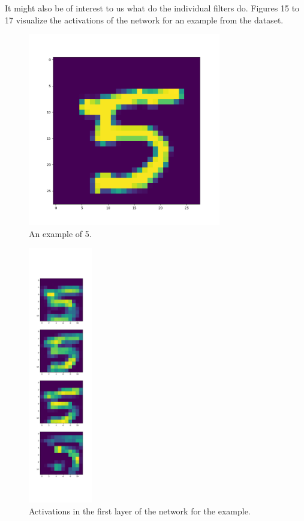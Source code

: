 \documentclass{article}
\begin{document}
It might also be of interest to us what do the individual filters do.
Figures 15 to 17 visualize the activations of the network for an example
from the dataset. 

\begin{figure}
  \centering
  \includegraphics[width=0.75\textwidth]{../../out/activations_cnn/mnist/t-sne/filter_outputs/class5_l0.png}
    \caption{An example of 5.}
\end{figure}

\begin{figure}
  \centering
  \includegraphics[width=0.25\textwidth]{../../out/activations_cnn/mnist/t-sne/filter_outputs/class5_l1.png}
  \caption{Activations in the first layer of the network for the example.}
\end{figure}
\end{document}
